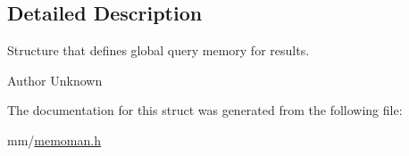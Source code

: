 \subsection{Detailed Description}
Structure that defines global query memory for results. 

\begin{DoxyAuthor}{Author}
Unknown 
\end{DoxyAuthor}


The documentation for this struct was generated from the following file\+:\begin{DoxyCompactItemize}
\item 
mm/\hyperlink{memoman_8h}{memoman.\+h}\end{DoxyCompactItemize}
